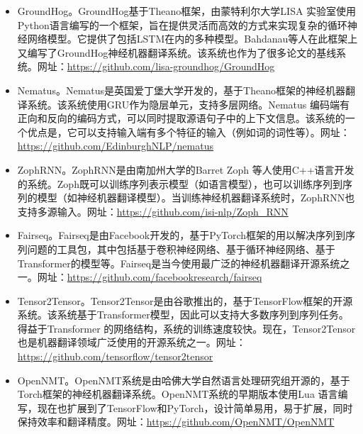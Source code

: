 \begin{appendices}
\begin{itemize}
\vspace{0.5em}
\item GroundHog。GroundHog基于Theano框架，由蒙特利尔大学LISA 实验室使用Python语言编写的一个框架，旨在提供灵活而高效的方式来实现复杂的循环神经网络模型。它提供了包括LSTM在内的多种模型。Bahdanau等人在此框架上又编写了GroundHog神经机器翻译系统。该系统也作为了很多论文的基线系统。网址：\url{https://github.com/lisa-groundhog/GroundHog}
\vspace{0.5em}
\item Nematus。Nematus是英国爱丁堡大学开发的，基于Theano框架的神经机器翻译系统。该系统使用GRU作为隐层单元，支持多层网络。Nematus 编码端有正向和反向的编码方式，可以同时提取源语句子中的上下文信息。该系统的一个优点是，它可以支持输入端有多个特征的输入（例如词的词性等）。网址：\url{https://github.com/EdinburghNLP/nematus}
\vspace{0.5em}
\item ZophRNN。ZophRNN是由南加州大学的Barret Zoph 等人使用C++语言开发的系统。Zoph既可以训练序列表示模型（如语言模型），也可以训练序列到序列的模型（如神经机器翻译模型）。当训练神经机器翻译系统时，ZophRNN也支持多源输入。网址：\url{https://github.com/isi-nlp/Zoph\_RNN}
\vspace{0.5em}
\item Fairseq。Fairseq是由Facebook开发的，基于PyTorch框架的用以解决序列到序列问题的工具包，其中包括基于卷积神经网络、基于循环神经网络、基于Transformer的模型等。Fairseq是当今使用最广泛的神经机器翻译开源系统之一。网址：\url{https://github.com/facebookresearch/fairseq}
\vspace{0.5em}
\item Tensor2Tensor。Tensor2Tensor是由谷歌推出的，基于TensorFlow框架的开源系统。该系统基于Transformer模型，因此可以支持大多数序列到序列任务。得益于Transformer 的网络结构，系统的训练速度较快。现在，Tensor2Tensor也是机器翻译领域广泛使用的开源系统之一。网址：\url{https://github.com/tensorflow/tensor2tensor}
\vspace{0.5em}
\item OpenNMT。OpenNMT系统是由哈佛大学自然语言处理研究组开源的，基于Torch框架的神经机器翻译系统。OpenNMT系统的早期版本使用Lua 语言编写，现在也扩展到了TensorFlow和PyTorch，设计简单易用，易于扩展，同时保持效率和翻译精度。网址：\url{https://github.com/OpenNMT/OpenNMT}
\vspace{0.5em}

\end{itemize}
\end{appendices}
